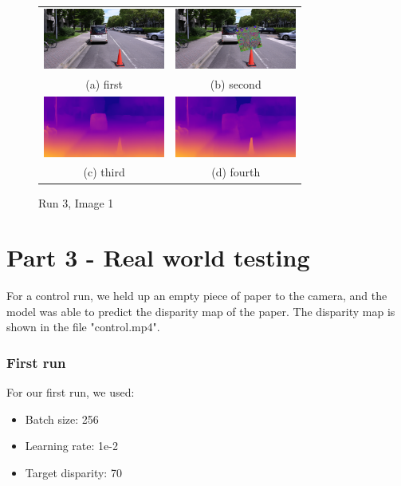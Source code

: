 \documentclass[conference]{IEEEtran}
\begin{document}
\begin{figure}
  \begin{tabular}{cc}
    \includegraphics[width=40mm]{./images/results/img1/Dst_checkpoints_result_epoch_970_patch/img_original.png} &   \includegraphics[width=40mm]{./images/results/img1/Dst_checkpoints_result_epoch_970_patch/img_attacked.png} \\
  (a) first & (b) second \\[6pt]
   \includegraphics[width=40mm]{./images/results/img1/Dst_checkpoints_result_epoch_970_patch/disp_original.png} &   \includegraphics[width=40mm]{./images/results/img1/Dst_checkpoints_result_epoch_970_patch/disp_attacked.png} \\
  (c) third & (d) fourth \\[6pt]
  \end{tabular}
  \caption{Run 3, Image 1}
  \end{figure}


\section{Part 3 - Real world testing}
For a control run, we held up an empty piece of paper to the camera, and the model was able to predict the disparity map of the paper. The disparity map is shown in the file "control.mp4".

\subsubsection{First run}
For our first run, we used:
\begin{itemize}
  \item Batch size: 256
  \item Learning rate: 1e-2
  \item Target disparity: 70
\end{itemize}
\end{document}
